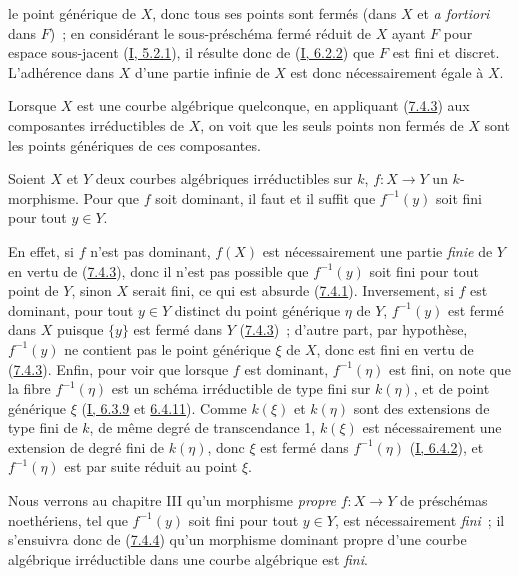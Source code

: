 le point générique de $X$, donc tous ses points sont fermés (dans $X$ et
\emph{a fortiori} dans $F$)~; en considérant le sous-préschéma fermé réduit de
$X$ ayant $F$ pour espace sous-jacent (\hyperref[I.5.2.1-fr]{I, 5.2.1}), il
résulte donc de (\hyperref[I.6.2.2-fr]{I, 6.2.2}) que $F$ est fini et discret.
L'adhérence dans $X$ d'une partie infinie de $X$ est donc nécessairement égale
à $X$.

Lorsque $X$ est une courbe algébrique quelconque, en appliquant
(\hyperref[II.7.4.3-fr]{7.4.3}) aux composantes irréductibles de $X$, on voit
que les seuls points non fermés de $X$ sont les points génériques de ces
composantes.

\begin{corollary}[7.4.4]
\label{II.7.4.4-fr}
Soient $X$ et $Y$ deux courbes algébriques irréductibles sur $k$, $f:X\to Y$
un $k$-morphisme. Pour que $f$ soit dominant, il faut et il suffit que
$f^{-1}(y)$ soit fini pour tout $y\in Y$.
\end{corollary}

En effet, si $f$ n'est pas dominant, $f(X)$ est nécessairement une partie
\emph{finie} de $Y$ en vertu de (\hyperref[II.7.4.3-fr]{7.4.3}), donc il n'est
pas possible que $f^{-1}(y)$ soit fini pour tout point de $Y$, sinon $X$ serait
fini, ce qui est absurde (\hyperref[II.7.4.1-fr]{7.4.1}). Inversement, si $f$
est dominant, pour tout $y\in Y$ distinct du point générique $\eta$ de $Y$,
$f^{-1}(y)$ est fermé dans $X$ puisque $\{y\}$ est fermé dans $Y$
(\hyperref[II.7.4.3-fr]{7.4.3})~; d'autre part, par hypothèse, $f^{-1}(y)$ ne
contient pas le point générique $\xi$ de $X$, donc est fini en vertu de
(\hyperref[II.7.4.3-fr]{7.4.3}). Enfin, pour voir que lorsque $f$ est dominant,
$f^{-1}(\eta)$ est fini, on note que la fibre $f^{-1}(\eta)$ est un schéma
irréductible de type fini sur $k(\eta)$, et de point générique $\xi$
(\hyperref[I.6.3.9-fr]{I, 6.3.9} et
\hyperref[I.6.4.11-fr]{6.4.11}). Comme $k(\xi)$ et $k(\eta)$ sont des
extensions de type fini de $k$, de même degré de transcendance 1, $k(\xi)$ est
nécessairement une extension de degré fini de $k(\eta)$, donc $\xi$ est fermé
dans $f^{-1}(\eta)$ (\hyperref[I.6.4.2-fr]{I, 6.4.2}), et $f^{-1}(\eta)$ est
par suite réduit au point $\xi$.

Nous verrons au chapitre III qu'un morphisme \emph{propre} $f:X\to Y$ de
préschémas noethériens, tel que $f^{-1}(y)$ soit fini pour tout $y\in Y$, est
nécessairement \emph{fini}~; il s'ensuivra donc de
(\hyperref[II.7.4.4-fr]{7.4.4}) qu'un morphisme dominant propre d'une courbe
algébrique irréductible dans une courbe algébrique est \emph{fini}.

